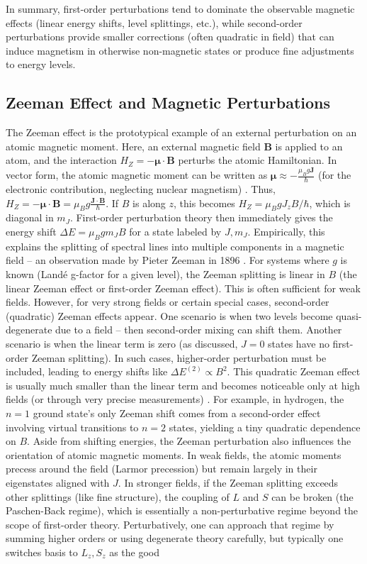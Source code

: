 \documentclass[12pt]{article}
\begin{document}
        In summary, first-order perturbations tend to dominate the observable magnetic effects (linear energy shifts, level splittings, etc.), while second-order perturbations provide smaller corrections (often quadratic in field) that can induce magnetism in otherwise non-magnetic states or produce fine adjustments to energy levels.

        \subsection{Zeeman Effect and Magnetic Perturbations}
        
            The Zeeman effect is the prototypical example of an external perturbation on an atomic magnetic moment. Here, an external magnetic field $\mathbf{B}$ is applied to an atom, and the interaction $H_Z = -\boldsymbol{\mu}\cdot \mathbf{B}$ perturbs the atomic Hamiltonian. In vector form, the atomic magnetic moment can be written as $\boldsymbol{\mu} \approx -\frac{\mu_B g \mathbf{J}}{\hbar}$ (for the electronic contribution, neglecting nuclear magnetism) \cite{ZeemanW}. Thus, $H_Z = -\boldsymbol{\mu}\cdot \mathbf{B} = \mu_B g \frac{\mathbf{J}\cdot \mathbf{B}}{\hbar}$. If $B$ is along $z$, this becomes $H_Z = \mu_B g J_z B/\hbar$, which is diagonal in $m_J$. First-order perturbation theory then immediately gives the energy shift $\Delta E = \mu_B g m_J B$ \cite{ZeemanW} for a state labeled by $J, m_J$. Empirically, this explains the splitting of spectral lines into multiple components in a magnetic field – an observation made by Pieter Zeeman in 1896 \cite{ZeemanW}. For systems where $g$ is known (Landé g-factor for a given level), the Zeeman splitting is linear in $B$ (the linear Zeeman effect or first-order Zeeman effect). This is often sufficient for weak fields. However, for very strong fields or certain special cases, second-order (quadratic) Zeeman effects appear. One scenario is when two levels become quasi-degenerate due to a field – then second-order mixing can shift them. Another scenario is when the linear term is zero (as discussed, $J=0$ states have no first-order Zeeman splitting). In such cases, higher-order perturbation must be included, leading to energy shifts like $\Delta E^{(2)} \propto B^2$. This quadratic Zeeman effect is usually much smaller than the linear term and becomes noticeable only at high fields (or through very precise measurements) \cite{QZeemanE}. For example, in hydrogen, the $n=1$ ground state’s only Zeeman shift comes from a second-order effect involving virtual transitions to $n=2$ states, yielding a tiny quadratic dependence on $B$. Aside from shifting energies, the Zeeman perturbation also influences the orientation of atomic magnetic moments. In weak fields, the atomic moments precess around the field (Larmor precession) but remain largely in their eigenstates aligned with $J$. In stronger fields, if the Zeeman splitting exceeds other splittings (like fine structure), the coupling of $L$ and $S$ can be broken (the Paschen-Back regime), which is essentially a non-perturbative regime beyond the scope of first-order theory. Perturbatively, one can approach that regime by summing higher orders or using degenerate theory carefully, but typically one switches basis to $L_z, S_z$ as the good 
\end{document}
